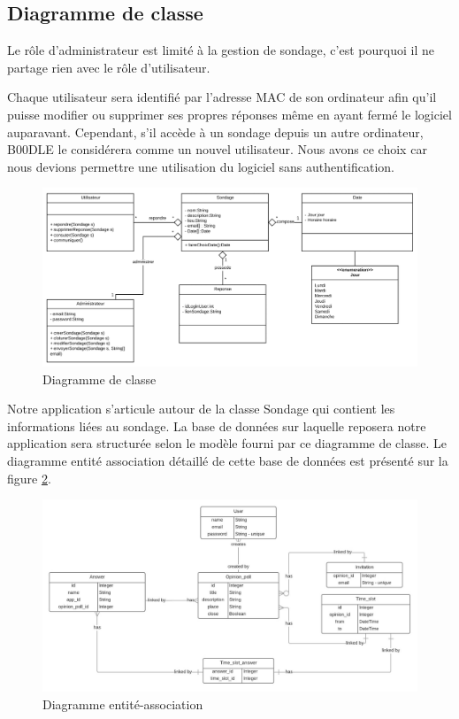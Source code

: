 \documentclass[titlepage]{report}
\begin{document}
\subsection{Diagramme de classe}

\par Le rôle d'administrateur est limité à la gestion de sondage, c'est pourquoi il ne partage rien avec le rôle d'utilisateur. 
\par Chaque utilisateur sera identifié par l'adresse MAC de son ordinateur afin qu'il puisse modifier ou supprimer ses propres réponses même en ayant fermé le logiciel auparavant. 
Cependant, s'il accède à un sondage depuis un autre ordinateur, B00DLE le considérera comme un nouvel utilisateur. Nous avons ce choix car nous devions permettre une utilisation du logiciel sans authentification.

\begin{figure}[h]
	\caption{Diagramme de classe}
	\label{diagramme_classes}
	\centering
	\includegraphics[width=\textwidth]{figures/diagrammes/classes.png}
\end{figure}

\par Notre application s'articule autour de la classe Sondage qui contient les informations liées au sondage. 
La base de données sur laquelle reposera notre application sera structurée selon le modèle fourni par ce diagramme de classe. 
Le diagramme entité association détaillé de cette base de données est présenté sur la figure \ref{diagramme_entiteAssociation}.

\begin{figure}[h]
	\caption{Diagramme entité-association}
	\label{diagramme_entiteAssociation}
	\centering
	\includegraphics[width=\textwidth]{figures/diagrammes/entiteAssociation.png}
\end{figure}
\end{document}

